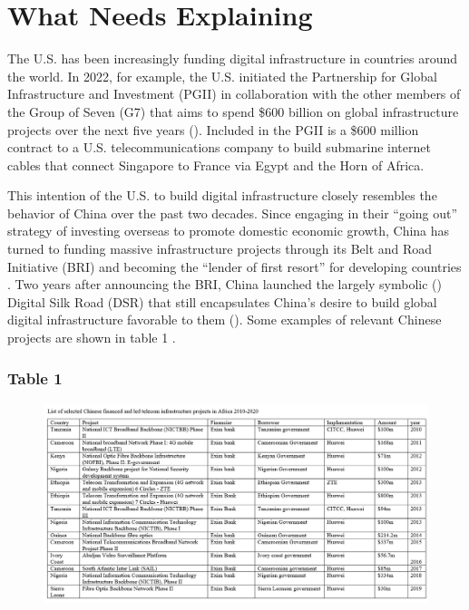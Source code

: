 \documentclass[12pt]{article}
\begin{document}
\section*{What Needs Explaining}
The U.S. has been increasingly funding digital infrastructure in countries around the world. In 2022, for example, the U.S. initiated the Partnership for Global Infrastructure and Investment (PGII) in collaboration with the other members of the Group of Seven (G7) that aims to spend \$600 billion on global infrastructure projects over the next five years (\cite{thewhitehouse2022}). Included in the PGII is a \$600 million contract to a U.S. telecommunications company to build submarine internet cables that connect Singapore to France via Egypt and the Horn of Africa. %

This intention of the U.S. to build digital infrastructure closely resembles the behavior of China over the past two decades. Since engaging in their ``going out'' strategy of investing overseas to promote domestic economic growth, China has turned to funding massive infrastructure projects through its Belt and Road Initiative (BRI) and becoming the ``lender of first resort'' for developing countries \parencite[1]{dreher2022}. Two years after announcing the BRI, China launched the largely symbolic (\cite{tugendhat2021}) Digital Silk Road (DSR) that still encapsulates China's desire to build global digital infrastructure favorable to them (\cite{shen2022}). Some examples of relevant Chinese projects are shown in table 1 \nocite{agbebi2022}.

\subsubsection*{Table 1}
\begin{figure}[htbp]
    \includegraphics[scale=0.449]{Figures/ChineseAid.png}
\end{figure}
\end{document}
